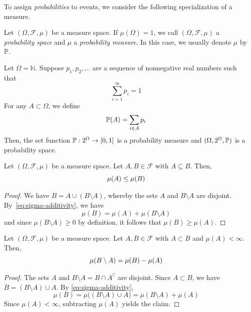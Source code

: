To assign \emph{probabilities} to events, we consider the following specialization of a measure.

\begin{definition}\label{def:probability-space}
  Let $(\Omega,\mathcal{F},\mu)$ be a measure space.
  If $\mu(\Omega) = 1$, we call $(\Omega,\mathcal{F},\mu)$ a \emph{probability space} and $\mu$ a \emph{probability measure}.
  In this case, we usually denote $\mu$ by $\mathbb{P}$.
\end{definition}

\begin{example}
Let $\Omega = \mathbb{N}$.
Suppose $p_1,p_2,\dots$ are a sequence of nonnegative real numbers such that
\[
  \sum_{i=1}^{\infty} p_i = 1
\]
For any $A \subset \Omega$, we define
\[
\mathbb{P}(A) = \sum_{i \in A} p_i
\]
Then, the set function $\mathbb{P}: 2^\Omega \to [0,1]$ is a probability measure and $(\Omega,2^\Omega,\mathbb{P})$ is a probability space.
\end{example}

\begin{theorem}[\textcolor{red}{monotonicity}]
\label{thm:subset-measure}
Let $(\Omega,\mathcal{F},\mu)$ be a measure space.
Let $A,B \in \mathcal{F}$ with $A \subseteq B$.
Then,
\begin{equation}
\label{eq:subset-measure}
  \mu(A) \le \mu(B)
  \qedhere
\end{equation}
\end{theorem}

\begin{proof}
We have $B = A \cup (B \setminus A)$, whereby the sets $A$ and $B \setminus A$ are disjoint.
By~\eqref{eq:sigma-additivity}, we have
\[
  \mu(B) = \mu(A) + \mu(B \setminus A)
\]
and since $\mu(B \setminus A) \ge 0$ by definition, it follows that $\mu(B) \ge \mu(A)$.
\end{proof}







\begin{corollary}
Let $(\Omega,\mathcal{F},\mu)$ be a measure space.
Let $A,B \in \mathcal{F}$ with $A \subset B$ and $\mu(A) < \infty$.
Then,
\begin{equation}
\mu(B \setminus A) = \mu(B) - \mu(A)
\label{eq:measure-difference}
\qedhere
\end{equation}
\end{corollary}
\begin{proof}
The sets $A$ and $B\setminus A = B \cap A^\complement$ are disjoint.
Since $A \subset B$, we have $B = (B\setminus A) \cup A$.
By \eqref{eq:sigma-additivity},
\[
\mu(B) = \mu\bigl((B\setminus A)\cup A\bigr) = \mu(B\setminus A) + \mu(A)
\]
Since $\mu(A) < \infty$, subtracting $\mu(A)$ yields the claim.
\end{proof}

